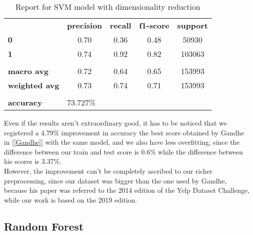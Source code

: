 \begin{table}[h!]
    \centering
    \begin{tabular}{lcccc}
        \rowcolor[HTML]{EEEEEE} 
        \cellcolor[HTML]{FBFBFB} & \textbf{precision} & \textbf{recall} & \textbf{f1-score} & \textbf{support} \\
        \rowcolor[HTML]{EEEEEE} 
        \textbf{0}               & 0.70               & 0.36            & 0.48              & 50930            \\
        \rowcolor[HTML]{EEEEEE} 
        \textbf{1}               & 0.74               & 0.92            & 0.82              & 103063           \\
        \rowcolor[HTML]{FBFBFB} 
        &                    &                 &                   &                  \\
        \rowcolor[HTML]{EEEEEE} 
        \textbf{macro avg}       & 0.72               & 0.64            & 0.65              & 153993           \\
        \rowcolor[HTML]{EEEEEE} 
        \textbf{weighted avg}    & 0.73               & 0.74            & 0.71              & 153993           \\
        \rowcolor[HTML]{FBFBFB} 
        &                    &                 &                   &                  \\
        \rowcolor[HTML]{EEEEEE} 
        \textbf{accuracy}        & \multicolumn{4}{l}{\cellcolor[HTML]{EEEEEE}73.727\%}                         
    \end{tabular}
    \caption{Report for SVM model with dimensionality reduction}
    \label{tab:svm-res-1}
\end{table}

Even if the results aren't extraordinary good, it has to be noticed that we registered a 4.79‬\% improvement in accuracy \wrt the best score obtained by Gandhe in [\ref{Gandhe}] with the same model, and we also have less overfitting, since the difference between our train and test score is 0.6\% while the difference between his scores is 3.37\%.\\
However, the improvement can't be completely ascribed to our richer preprocessing, since our dataset was bigger than the one used by Gandhe, because his paper was referred to the 2014 edition of the Yelp Dataset Challenge, while our work is based on the 2019 edition.


\newpage
\subsection{Random Forest}\label{sec:rf}

